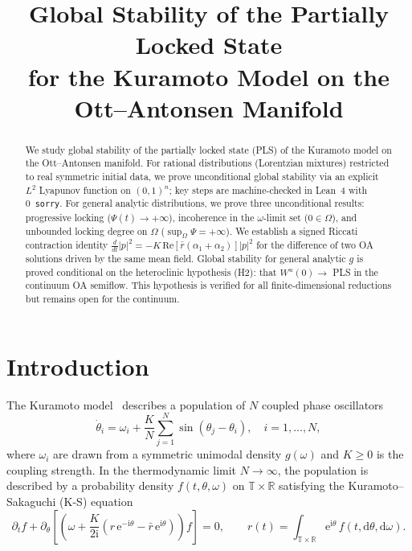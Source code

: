 \documentclass[11pt,a4paper]{article}
\title{Global Stability of the Partially Locked State\\for the Kuramoto Model on the Ott--Antonsen Manifold}
\author{}
\date{}
\theoremstyle{definition}
\newcommand{\R}{\mathbb{R}}
\newcommand{\T}{\mathbb{T}}
\begin{document}
\maketitle

\begin{abstract}
We study global stability of the partially locked state (PLS) of the Kuramoto model on the Ott--Antonsen manifold. For rational distributions (Lorentzian mixtures) restricted to real symmetric initial data, we prove unconditional global stability via an explicit $L^2$ Lyapunov function on $(0,1)^n$; key steps are machine-checked in Lean~4 with 0~\texttt{sorry}. For general analytic distributions, we prove three unconditional results: progressive locking ($\Psi(t) \to +\infty$), incoherence in the $\omega$-limit set ($0 \in \Omega$), and unbounded locking degree on $\Omega$ ($\sup_\Omega\Psi = +\infty$). We establish a signed Riccati contraction identity $\frac{d}{dt}|p|^2 = -K\,\mathrm{Re}[\bar{r}(\alpha_1+\alpha_2)]|p|^2$ for the difference of two OA solutions driven by the same mean field. Global stability for general analytic $g$ is proved conditional on the heteroclinic hypothesis (H2): that $W^u(0) \to$ PLS in the continuum OA semiflow. This hypothesis is verified for all finite-dimensional reductions but remains open for the continuum.
\end{abstract}

\tableofcontents

\section{Introduction}

The Kuramoto model~\cite{kuramoto1975} describes a population of $N$ coupled phase oscillators
\[
\dot{\theta}_i = \omega_i + \frac{K}{N}\sum_{j=1}^N \sin(\theta_j - \theta_i), \quad i = 1,\ldots,N,
\]
where $\omega_i$ are drawn from a symmetric unimodal density $g(\omega)$ and $K \geq 0$ is the coupling strength. In the thermodynamic limit $N \to \infty$, the population is described by a probability density $f(t,\theta,\omega)$ on $\T \times \R$ satisfying the Kuramoto--Sakaguchi (K-S) equation
\begin{equation}\label{eq:ks}
\partial_t f + \partial_\theta\!\left[\left(\omega + \frac{K}{2\mathrm{i}}\left(r\,\mathrm{e}^{-\mathrm{i}\theta} - \bar{r}\,\mathrm{e}^{\mathrm{i}\theta}\right)\right)f\right] = 0, \qquad r(t) = \int_{\T \times \R} \mathrm{e}^{\mathrm{i}\theta}\,f(t,\mathrm{d}\theta,\mathrm{d}\omega).
\end{equation}
\end{document}

